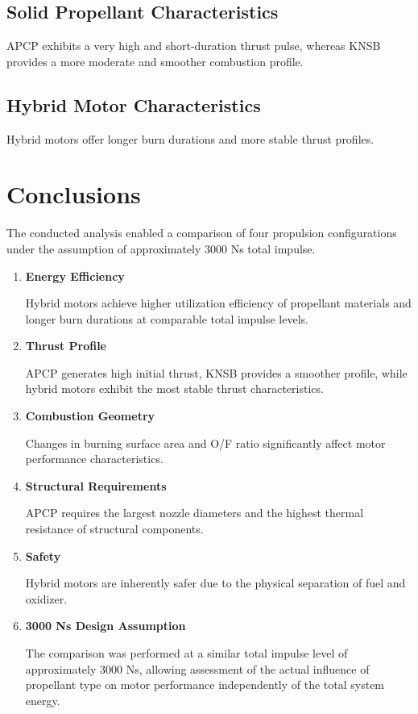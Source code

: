 \documentclass[a4paper,12pt]{article}
\begin{document}
\subsection{Solid Propellant Characteristics}

APCP exhibits a very high and short-duration thrust pulse, whereas KNSB provides a more moderate and smoother combustion profile.

\subsection{Hybrid Motor Characteristics}

Hybrid motors offer longer burn durations and more stable thrust profiles.

\section{Conclusions}

The conducted analysis enabled a comparison of four propulsion configurations under the assumption of approximately 3000 Ns total impulse.

\begin{enumerate}

\item \textbf{Energy Efficiency}

Hybrid motors achieve higher utilization efficiency of propellant materials and longer burn durations at comparable total impulse levels.

\item \textbf{Thrust Profile}

APCP generates high initial thrust, KNSB provides a smoother profile, while hybrid motors exhibit the most stable thrust characteristics.

\item \textbf{Combustion Geometry}

Changes in burning surface area and O/F ratio significantly affect motor performance characteristics.

\item \textbf{Structural Requirements}

APCP requires the largest nozzle diameters and the highest thermal resistance of structural components.

\item \textbf{Safety}

Hybrid motors are inherently safer due to the physical separation of fuel and oxidizer.

\item \textbf{3000 Ns Design Assumption}

The comparison was performed at a similar total impulse level of approximately 3000 Ns, allowing assessment of the actual influence of propellant type on motor performance independently of the total system energy.

\end{enumerate}
\end{document}

